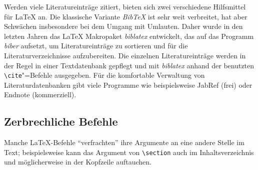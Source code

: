 
Werden viele Literatureinträge zitiert, bieten sich zwei verschiedene Hilfsmittel für \LaTeX{} an. Die klassische Variante \emph{Bib\TeX} ist sehr weit verbreitet, hat aber Schwächen insbesondere bei dem Umgang mit Umlauten. Daher wurde in den letzten Jahren das \LaTeX{} Makropaket \emph{biblatex} entwickelt, das auf das Programm \emph{biber} aufsetzt, um Literatureinträge zu sortieren und für die Literaturverzeichnisse aufzubereiten. Die einzelnen Literatureinträge werden in der Regel in einer Textdatenbank gepflegt und mit \emph{biblatex} anhand der benutzten \lstinline|\cite|"=Befehle ausgegeben. Für die komfortable Verwaltung von Literaturdatenbanken gibt viele Programme wie beispielsweise JabRef (frei) oder Endnote (kommerziell).

\subsection{Zerbrechliche Befehle}
 
Manche \LaTeX-Befehle "`verfrachten"' ihre Argumente an eine andere
Stelle im Text; beispielsweise kann das Argument von \lstinline|\section|
auch im Inhaltsverzeichnis und möglicherweise in der Kopfzeile auftauchen.  

